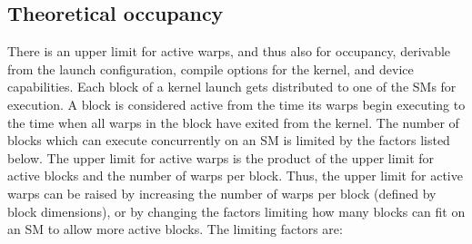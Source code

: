 \documentclass[oneside,openright,12pt,final,en]{mgr}
\begin{document}
\subsection{Theoretical occupancy}
There is an upper limit for active warps, and thus also for occupancy, derivable from the launch configuration, compile options for the kernel, and device capabilities. Each block of a kernel launch gets distributed to one of the SMs for execution. A block is considered active from the time its warps begin executing to the time when all warps in the block have exited from the kernel. The number of blocks which can execute concurrently on an SM is limited by the factors listed below. The upper limit for active warps is the product of the upper limit for active blocks and the number of warps per block. Thus, the upper limit for active warps can be raised by increasing the number of warps per block (defined by block dimensions), or by changing the factors limiting how many blocks can fit on an SM to allow more active blocks. The limiting factors are:
\end{document}
